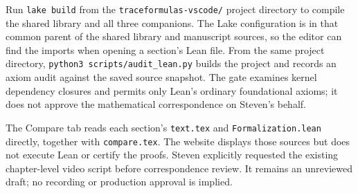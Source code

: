 Run \texttt{lake build} from the \texttt{traceformulas-vscode/} project directory to compile the shared library and all three companions. The Lake configuration is in that common parent of the shared library and manuscript sources, so the editor can find the imports when opening a section's Lean file. From the same project directory, \texttt{python3 scripts/audit\_lean.py} builds the project and records an axiom audit against the saved source snapshot. The gate examines kernel dependency closures and permits only Lean's ordinary foundational axioms; it does not approve the mathematical correspondence on Steven's behalf.

The Compare tab reads each section's \texttt{text.tex} and \texttt{Formalization.lean} directly, together with \texttt{compare.tex}. The website displays those sources but does not execute Lean or certify the proofs. Steven explicitly requested the existing chapter-level video script before correspondence review. It remains an unreviewed draft; no recording or production approval is implied.
